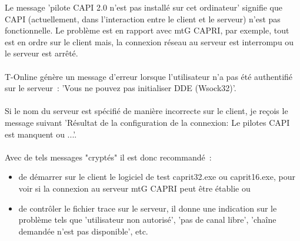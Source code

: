     Le message 'pilote CAPI 2.0 n'est pas installé sur cet ordinateur' signifie que CAPI (actuellement,
	dans l'interaction entre le client et le serveur) n'est pas fonctionnelle. Le problème est en rapport
	avec mtG CAPRI, par exemple, tout est en ordre sur le client mais, la connexion réseau au serveur est
	interrompu ou le serveur est arrêté. \\
    \\
    T-Online génère un message d'erreur lorsque l'utilisateur n'a pas été authentifié sur le serveur~:
	'Vous ne pouvez pas initialiser DDE (Wsock32)'. \\
    \\
    Si le nom du serveur est spécifié de manière incorrecte sur le client, je reçois le message suivant
	'Résultat de la configuration de la connexion: Le pilotes CAPI est manquent ou ...'. \\
    \\
    Avec de tels messages "cryptés" il est donc recommandé~:
    \begin{itemize}
        \item de démarrer sur le client le logiciel de test caprit32.exe ou caprit16.exe, pour voir si la connexion
		au serveur mtG CAPRI peut être établie ou
        \item de contrôler le fichier trace sur le serveur, il donne une indication sur le problème tels que
		'utilisateur non autorisé', 'pas de canal libre', 'chaîne demandée n'est pas disponible', etc.
    \end{itemize}


